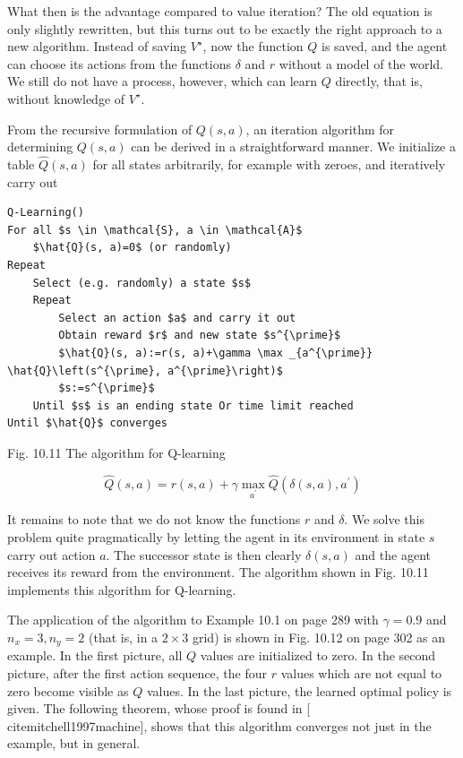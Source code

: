 \documentclass[10pt]{book}
\begin{document}
What then is the advantage compared to value iteration? The old equation is only slightly rewritten, but this turns out to be exactly the right approach to a new algorithm. Instead of saving $V^{\star}$, now the function $Q$ is saved, and the agent can choose its actions from the functions $\delta$ and $r$ without a model of the world. We still do not have a process, however, which can learn $Q$ directly, that is, without knowledge of $V^{\star}$.

From the recursive formulation of $Q(s, a)$, an iteration algorithm for determining $Q(s, a)$ can be derived in a straightforward manner. We initialize a table $\hat{Q}(s, a)$ for all states arbitrarily, for example with zeroes, and iteratively carry out

\begin{verbatim}
Q-Learning()
For all $s \in \mathcal{S}, a \in \mathcal{A}$
    $\hat{Q}(s, a)=0$ (or randomly)
Repeat
    Select (e.g. randomly) a state $s$
    Repeat
        Select an action $a$ and carry it out
        Obtain reward $r$ and new state $s^{\prime}$
        $\hat{Q}(s, a):=r(s, a)+\gamma \max _{a^{\prime}} \hat{Q}\left(s^{\prime}, a^{\prime}\right)$
        $s:=s^{\prime}$
    Until $s$ is an ending state Or time limit reached
Until $\hat{Q}$ converges
\end{verbatim}

Fig. 10.11 The algorithm for Q-learning



\begin{equation*}
\hat{Q}(s, a)=r(s, a)+\gamma \max _{a^{\prime}} \hat{Q}\left(\delta(s, a), a^{\prime}\right) \tag{10.12}
\end{equation*}


It remains to note that we do not know the functions $r$ and $\delta$. We solve this problem quite pragmatically by letting the agent in its environment in state $s$ carry out action $a$. The successor state is then clearly $\delta(s, a)$ and the agent receives its reward from the environment. The algorithm shown in Fig. 10.11 implements this algorithm for Q-learning.

The application of the algorithm to Example 10.1 on page 289 with $\gamma=0.9$ and $n_{x}=3, n_{y}=2$ (that is, in a $2 \times 3$ grid) is shown in Fig. 10.12 on page 302 as an example. In the first picture, all $Q$ values are initialized to zero. In the second picture, after the first action sequence, the four $r$ values which are not equal to zero become visible as $Q$ values. In the last picture, the learned optimal policy is given. The following theorem, whose proof is found in [\\cite{mitchell1997machine}], shows that this algorithm converges not just in the example, but in general.
\end{document}
